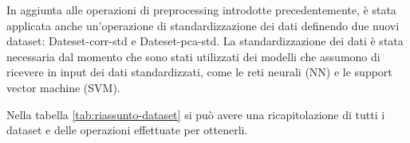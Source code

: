 In aggiunta alle operazioni di preprocessing introdotte precedentemente, è stata
applicata anche un'operazione di standardizzazione dei dati definendo due nuovi
dataset: Dateset-corr-std e Dateset-pca-std. La standardizzazione dei dati è
stata necessaria dal momento che sono stati utilizzati dei modelli che assumono
di ricevere in input dei dati standardizzati, come le reti neurali (NN) e le 
support vector machine (SVM).
 
Nella tabella \ref{tab:riassunto-dataset} si può avere una ricapitolazione di
tutti i dataset e delle operazioni effettuate per ottenerli.

\begin{table}[ht]
      \caption{Tabella riassuntiva dei dataset}
      \label{tab:riassunto-dataset}
\end{table}